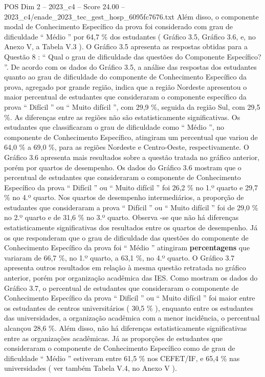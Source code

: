 \begin{textsample}{POS Dim 2 – 2023\_c4 – Score 24.00 – 2023\_c4/enade\_2023\_tec\_gest\_hosp\_6095fc7676.txt}
Além disso, o componente modal de Conhecimento Específico da prova foi considerado com grau de dificuldade “ Médio ” por 64,7 \% dos estudantes ( Gráfico 3.5, Gráfico 3.6, e, no Anexo V, a Tabela V.3 ).
O Gráfico 3.5 apresenta as respostas obtidas para a Questão 8 : “ Qual o grau de dificuldade das questões do Componente Específico? ”.
De acordo com os dados do Gráfico 3.5, a análise das respostas dos estudantes quanto ao grau de dificuldade do componente de Conhecimento Específico da prova, agregado por grande região, indica que a região Nordeste apresentou o maior percentual de estudantes que consideraram o componente específico da prova “ Difícil ” ou “ Muito difícil ”, com 29,9 \%, seguida da região Sul, com 29,5 \%.
As diferenças entre as regiões não são estatisticamente significativas.
Os estudantes que classificaram o grau de dificuldade como “ Médio ”, no componente de Conhecimento Específico, atingiram um percentual que variou de 64,0 \% a 69,0 \%, para as regiões Nordeste e Centro-Oeste, respectivamente.
O Gráfico 3.6 apresenta mais resultados sobre a questão tratada no gráfico anterior, porém por quartos de desempenho.
Os dados do Gráfico 3.6 mostram que o percentual de estudantes que consideraram o componente de Conhecimento Específico da prova “ Difícil ” ou “ Muito difícil ” foi 26,2 \% no 1.º quarto e 29,7 \% no 4.º quarto.
Nos quartos de desempenho intermediários, a proporção de estudantes que consideraram a prova “ Difícil ” ou “ Muito difícil ” foi de 29,0 \% no 2.º quarto e de 31,6 \% no 3.º quarto.
Observa -se que não há diferenças estatisticamente significativas dos resultados entre os quartos de desempenho.
Já os que responderam que o grau de dificuldade das questões do componente de Conhecimento Específico da prova foi “ Médio ” atingiram \textbf{percentagens} que variaram de 66,7 \%, no 1.º quarto, a 63,1 \%, no 4.º quarto.
O Gráfico 3.7 apresenta outros resultados em relação à mesma questão retratada no gráfico anterior, porém por organização acadêmica das IES.
Como mostram os dados do Gráfico 3.7, o percentual de estudantes que consideraram o componente de Conhecimento Específico da prova “ Difícil ” ou “ Muito difícil ” foi maior entre os estudantes de centros universitários ( 30,5 \% ), enquanto entre os estudantes das universidades, a organização acadêmica com a menor incidência, o percentual alcançou 28,6 \%.
Além disso, não há diferenças estatisticamente significativas entre as organizações acadêmicas.
Já as proporções de estudantes que consideraram o componente de Conhecimento Específico como de grau de dificuldade “ Médio ” estiveram entre 61,5 \% nos CEFET/IF, e 65,4 \% nas universidades ( ver também Tabela V.4, no Anexo V ).

\end{textsample}
